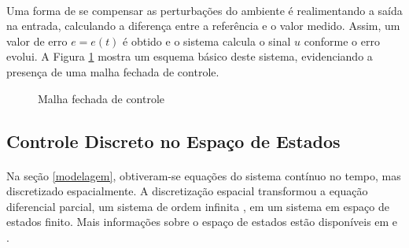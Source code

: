 \paragraph{} Uma forma de se compensar as perturbações do ambiente é realimentando a saída na entrada, calculando a diferença entre a referência e o valor medido. Assim, um valor de erro $e = e(t)$ é obtido e o sistema calcula o sinal $u$ conforme o erro evolui. A Figura \ref{mfechadatikz} mostra um esquema básico deste sistema, evidenciando a presença de uma malha fechada de controle.


\begin{figure}[!ht]
\centering
\caption{Malha fechada de controle\label{mfechadatikz}}
\end{figure}

\subsection{Controle Discreto no Espaço de Estados}
\paragraph{} Na seção \ref{modelagem}, obtiveram-se equações do sistema contínuo no tempo, mas discretizado espacialmente. A discretização espacial transformou a equação diferencial parcial, um sistema de ordem infinita \cite{fabricioIFAC}, em um sistema em espaço de estados finito. Mais informações sobre o espaço de estados estão disponíveis em \cite{Ogata:2010} e \cite{OgataDiscrete:1995}. 
